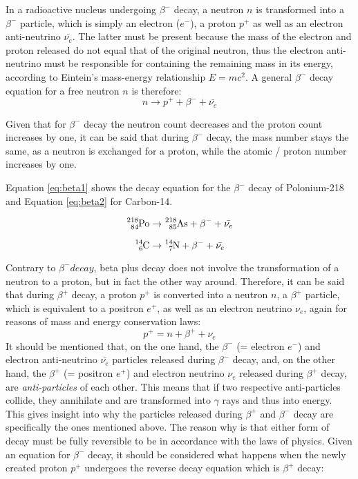 
In a radioactive nucleus undergoing $\beta^-$ decay, a neutron $n$ is transformed into a $\beta^-$ particle, which is simply an electron ($e^-$), a proton $p^+$ as well as an electron anti-neutrino $\bar{\nu_{e}}$. The latter must be present because the mass of the electron and proton released do not equal that of the original neutron, thus the electron anti-neutrino must be responsible for containing the remaining mass in its energy, according to Eintein's mass-energy relationship $E = mc^2$. A general $\beta^-$ decay equation for a free neutron $n$ is therefore: $$n \rightarrow p^+ + \beta^- + \bar{\nu_{e}}$$

Given that for $\beta^-$ decay the neutron count decreases and the proton count increases by one, it can be said that during $\beta^-$ decay, the mass number stays the same, as a neutron is exchanged for a proton, while the atomic / proton number increases by one.

Equation \ref{eq:beta1} shows the decay equation for the $\beta^-$ decay of Polonium-218 and Equation \ref{eq:beta2} for Carbon-14.

\begin{equation}
  \ce{^{218}_{84}Po} \rightarrow \ce{^{218}_{85}As} + \beta^- + \bar{\nu_{e}}
  \label{eq:beta1}
\end{equation}

\begin{equation}
  \ce{^{14}_{6}C} \rightarrow \ce{^{14}_{7}N} + \beta^- + \bar{\nu_{e}}
  \label{eq:beta2}
\end{equation}


Contrary to $\beta^- decay$, beta plus decay does not involve the transformation of a neutron to a proton, but in fact the other way around. Therefore, it can be said that during $\beta^+$ decay, a proton $p^+$ is converted into a neutron $n$, a $\beta^+$ particle, which is equivalent to a positron $e^+$, as well as an electron neutrino $\nu_{e}$, again for reasons of mass and energy conservation laws: $$p^+ = n + \beta^+ + \nu_{e}$$ It should be mentioned that, on the one hand, the $\beta^-$ (= electron $e^-$) and electron anti-neutrino $\bar{\nu_{e}}$ particles released during $\beta^-$ decay, and, on the other hand, the $\beta^+$ (= positron $e^+$) and electron neutrino $\nu_{e}$ released during $\beta^+$ decay, are \emph{anti-particles} of each other. This means that if two respective anti-particles collide, they annihilate and are transformed into $\gamma$ rays and thus into energy. This gives insight into why the particles released during $\beta^+$ and $\beta^-$ decay are specifically the ones mentioned above. The reason why is that either form of decay must be fully reversible to be in accordance with the laws of physics. Given an equation for $\beta^-$ decay, it should be considered what happens when the newly created proton $p^+$ undergoes the reverse decay equation which is $\beta^+$ decay: 

